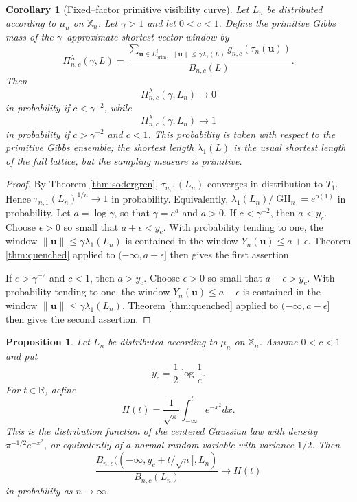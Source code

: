 \documentclass[a4paper,12pt]{article}
\newtheorem{prop}[thm]{Proposition}
\newtheorem{cor}[thm]{Corollary}
\theoremstyle{definition}
\theoremstyle{remark}
\newcommand{\re}{\mathbb R}
\newcommand{\GH}{\operatorname{GH}}
\newcommand{\prim}{\operatorname{prim}}
\begin{document}
\begin{cor}[Fixed--factor primitive visibility curve]
\label{cor:fixedfactor}
Let $L_n$ be distributed according to $\mu_n$ on $\mathbb X_n$.
Let $\gamma>1$ and let $0<c<1$.
Define the primitive Gibbs mass of the $\gamma$--approximate shortest-vector window by
$$
\Pi_{n,c}^{\lambda}(\gamma,L)=
\frac{
\sum_{\bm u\in L_{\prim}^\sharp,\ \|\bm u\|\le\gamma\lambda_1(L)}
 g_{n,c}(\tau_n(\bm u))}
{B_{n,c}(L)}.
$$
Then
$$
\Pi_{n,c}^{\lambda}(\gamma,L_n)\to0
$$
in probability if $c<\gamma^{-2}$, while
$$
\Pi_{n,c}^{\lambda}(\gamma,L_n)\to1
$$
in probability if $c>\gamma^{-2}$ and $c<1$.
This probability is taken with respect to the primitive Gibbs ensemble; the shortest length 
$\lambda_1(L)$ is the usual shortest length of the full lattice, but the sampling measure is primitive.
\end{cor}

\begin{proof}
By Theorem \ref{thm:sodergren}, $\tau_{n,1}(L_n)$ converges in distribution to $T_1$.
Hence $\tau_{n,1}(L_n)^{1/n}\to1$ in probability.
Equivalently, $\lambda_1(L_n)/\GH_n=e^{o(1)}$ in probability.
Let $a=\log\gamma$, so that $\gamma=e^a$ and $a>0$. 
If $c<\gamma^{-2}$, then $a<y_c$. 
Choose $\epsilon>0$ so small that $a+\epsilon<y_c$.
With probability tending to one, 
the window $\|\bm u\|\le\gamma\lambda_1(L_n)$ is contained in the window $Y_n(\bm u)\le a+\epsilon$.
Theorem \ref{thm:quenched} applied to $(-\infty,a+\epsilon]$ then gives the first assertion.

If $c>\gamma^{-2}$ and $c<1$, then $a>y_c$.
Choose $\epsilon>0$ so small that $a-\epsilon>y_c$.
With probability tending to one, the window $Y_n(\bm u)\le a-\epsilon$ is contained in the window $\|\bm u\|\le\gamma\lambda_1(L_n)$.
Theorem \ref{thm:quenched} applied to $(-\infty,a-\epsilon]$ then gives the second assertion.
\end{proof}

\begin{prop}
\label{prop:local-critical-thermal-mass}
Let $L_n$ be distributed according to $\mu_n$ on $\mathbb X_n$.
Assume $0<c<1$ and put
$$
y_c=\frac{1}{2}\log\frac{1}{c}.
$$
For $t\in\re$, define
$$
H(t)=\frac{1}{\sqrt{\pi}}\int_{-\infty}^{t}e^{-x^2}dx.
$$
This is the distribution function of the centered Gaussian law with density
$\pi^{-1/2}e^{-x^2}$, or equivalently of a normal random variable with
variance $1/2$.
Then
$$
\frac{
B_{n,c}((-\infty,y_c+t/\sqrt{n}],L_n)
}{
B_{n,c}(L_n)
}
\longrightarrow H(t)
$$
in probability as $n\to\infty$.
\end{prop}
\end{document}
